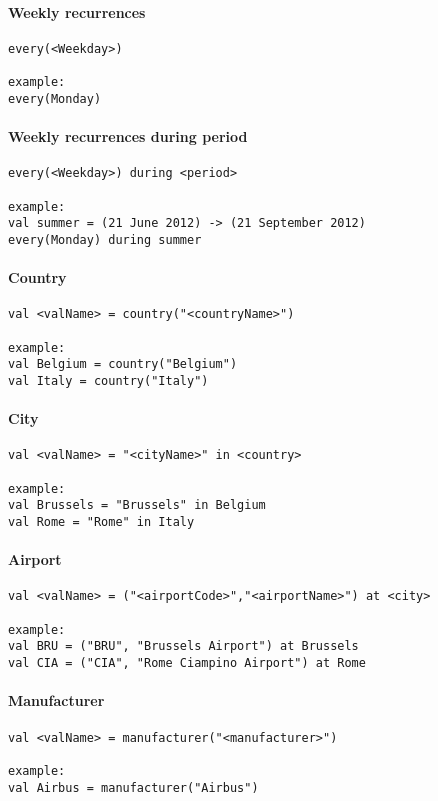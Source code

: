 	    
\paragraph{Weekly recurrences}\hfill
\begin{lstlisting}
every(<Weekday>)

example:
every(Monday)
\end{lstlisting}
	    
\paragraph{Weekly recurrences during period}\hfill
\begin{lstlisting}
every(<Weekday>) during <period>
 
example:
val summer = (21 June 2012) -> (21 September 2012)
every(Monday) during summer
\end{lstlisting}

\paragraph{Country}\hfill
\begin{lstlisting}
val <valName> = country("<countryName>")

example:
val Belgium = country("Belgium")
val Italy = country("Italy")
\end{lstlisting}

\paragraph{City}\hfill
\begin{lstlisting}
val <valName> = "<cityName>" in <country>

example:
val Brussels = "Brussels" in Belgium
val Rome = "Rome" in Italy
\end{lstlisting}

\paragraph{Airport}\hfill
\begin{lstlisting}
val <valName> = ("<airportCode>","<airportName>") at <city>
   
example:
val BRU = ("BRU", "Brussels Airport") at Brussels
val CIA = ("CIA", "Rome Ciampino Airport") at Rome
\end{lstlisting}

\paragraph{Manufacturer}\hfill
\begin{lstlisting}
val <valName> = manufacturer("<manufacturer>")

example:
val Airbus = manufacturer("Airbus")
\end{lstlisting}

